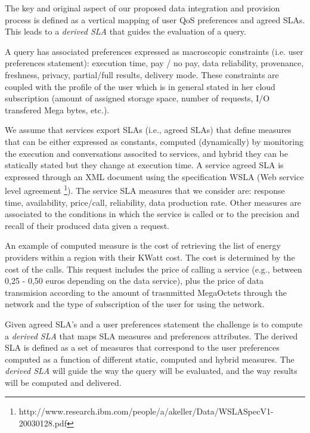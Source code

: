 The key and original aspect of   our proposed data integration and provision process is  defined as a vertical mapping of user QoS preferences and agreed SLAs. This  leads to a {\em derived SLA} that guides the evaluation of a query. 

A query has associated preferences  expressed as macroscopic constraints (i.e. user preferences statement): execution time, pay / no pay, data reliability, provenance, freshness, privacy, partial/full results, delivery mode. These constraints are coupled with the profile of the user which is in general stated in her cloud subscription (amount of assigned storage space, number of requests, I/O transfered Mega bytes, etc.). 




We assume that services export SLAs (i.e., agreed SLAs) that define measures   that can be either expressed as constants,  computed (dynamically) by monitoring the execution and conversations associted to services, and hybrid they can be statically stated  but they change at execution time.  A service  agreed SLA is expressed through an  XML document using the specification WSLA (Web service level agreement \footnote{\footnotesize http://www.research.ibm.com/people/a/akeller/\-Data/WSLASpecV1-20030128.pdf}). The service SLA measures  that we consider are: response time, availability, price/call, reliability, data production rate. Other measures are associated to the conditions in which the service is called or to the precision and recall of their produced data given a request. 

An example of computed measure is the cost of retrieving the list of energy providers within a region with their KWatt cost. The cost is determined by the  cost of the calls. This request  includes the price of calling a service (e.g.,  between 0,25 - 0,50 euros depending on the data service), plus the price of data transmision according to the amount of trasnmitted MegaOctets through the network and the type of subscription of the user for using the network. 

Given agreed SLA's and a user preferences statement the challenge is to compute a  {\em derived SLA} that  maps SLA measures and preferences attributes.  The derived SLA is defined as a set of measures that correspond to the user preferences computed as a function of different static, computed and hybrid measures. The {\em derived SLA}  will guide the way the query will be evaluated, and the way results will be computed and delivered.

